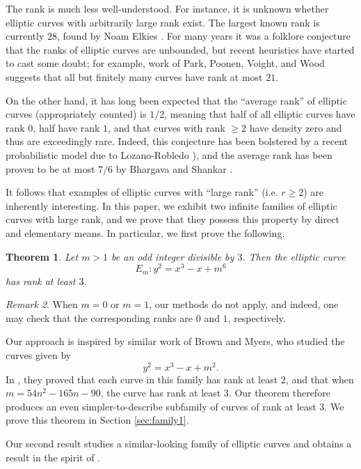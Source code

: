 \documentclass{amsart}
\newtheorem{theorem}{Theorem}[section]
\numberwithin{equation}{section}
\theoremstyle{remark}
\newtheorem{remark}[theorem]{Remark}
\begin{document}
The rank is much less well-understood. For instance, it is unknown whether elliptic curves with arbitrarily large rank exist. The largest known rank is currently $28$, found by Noam Elkies \cite{dujella}. For many years it was a folklore conjecture that the ranks of elliptic curves are unbounded, but recent heuristics have started to cast some doubt; for example, work of Park, Poonen, Voight, and Wood \cite{PPVW} suggests that all but finitely many curves have rank at most $21$.

On the other hand, it has long been expected that the ``average rank'' of elliptic curves (appropriately counted) is $1/2$, meaning that half of all elliptic curves have rank $0$, half have rank $1$, and that curves with rank $\geq 2$ have density zero and thus are exceedingly rare. Indeed, this conjecture has been bolstered by a recent probabilistic model due to Lozano-Robledo \cite[Theorem 1.2]{Alvaro-heuristic}), and the average rank has been proven to be at most $7/6$ by Bhargava and Shankar \cite{BhargavaShankhar}.

It follows that examples of elliptic curves with ``large rank'' (i.e. $r \geq 2$) are inherently interesting. In this paper, we exhibit two infinite families of elliptic curves with large rank, and we prove that they possess this property by direct and elementary means. In particular, we first prove the following.

\begin{theorem}\label{thm:main-intro-rk3}
Let $m>1$ be an odd integer divisible by $3$. Then the elliptic curve
\[
E_m \colon y^2 = x^3 - x + m^6
\]
has rank at least $3$.
\end{theorem}

\begin{remark}
When $m=0$ or $m=1$, our methods do not apply, and indeed, one may check that the corresponding ranks are $0$ and $1$, respectively.
\end{remark}

Our approach is inspired by similar work of Brown and Myers, who studied the curves given by
\[
y^2 = x^3-x+m^2.
\]
In \cite{BrownMyers}, they proved that each curve in this family has rank at least $2$, and that when $m=54n^2 - 165n-90$, the curve has rank at least $3$. Our theorem therefore produces an even simpler-to-describe subfamily of curves of rank at least $3$. We prove this theorem in Section \ref{sec:family1}.

Our second result studies a similar-looking family of elliptic curves and obtains a result in the spirit of \cite[Theorem 1]{BrownMyers}.
\end{document}
